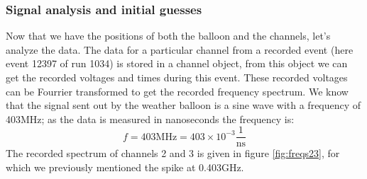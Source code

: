 \subsubsection{Signal analysis and initial guesses}
Now that we have the positions of both the balloon and the channels, let's
analyze the data. The data for a particular channel from a
recorded event (here event 12397 of run 1034) is stored in a channel object,
from this object we can get the recorded voltages and times during this event.
These recorded voltages can be Fourrier transformed to get the recorded
frequency spectrum.  We know that the signal sent out by the weather balloon is
a sine wave with a frequency of 403MHz; as the data is measured in nanoseconds
the frequency is:
\begin{equation}
	f = 403\text{MHz} = 403\times 10^{-3} \frac{1}{\text{ns}}
\end{equation}
The recorded spectrum of channels 2 and 3 is given in figure \ref{fig:freqs23}, for 
which we previously mentioned the spike at 0.403GHz.
